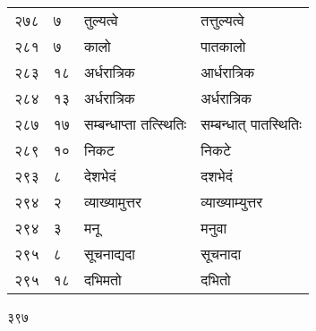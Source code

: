\documentclass[11pt, openany]{book}
\begin{document}
\begin{longtable}{p{1cm} p{1.5cm} p{4.5cm} p{4.5cm}}
 २७८ & ७ & तुल्यत्वे & तत्तुल्यत्वे \\

 २८१ & ७ & कालो & पातकालो \\

 २८३ & १८ & अर्धरात्रिक & आर्धरात्रिक \\

 २८४ & १३ & अर्धरात्रिक  & अर्धरात्रिक \\

 २८७ & १७ & सम्बन्धाप्ता तत्स्थितिः & सम्बन्धात् पातस्थितिः \\

 २८९ & १० & निकट & निकटे \\

 २९३ & ८ & देशभेदं & दशभेदं \\

 २९४ & २ & व्याख्यामुत्तर & व्याख्याम्युत्तर \\

 २९४ & ३ & मनू & मनुवा \\

 २९५ & ८ & सूचनाद्यदा & सूचनादा \\

 २९५ & १८ & दभिमतो & दभितो \\
\end{longtable}


\newpage

\begin{center}
 ३९७ 
\end{center}
\end{document}
